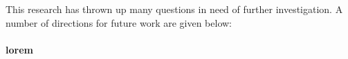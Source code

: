 This research has thrown up many questions
in need of further investigation.
A number of directions for future work are
given below:

\paragraph{lorem}
